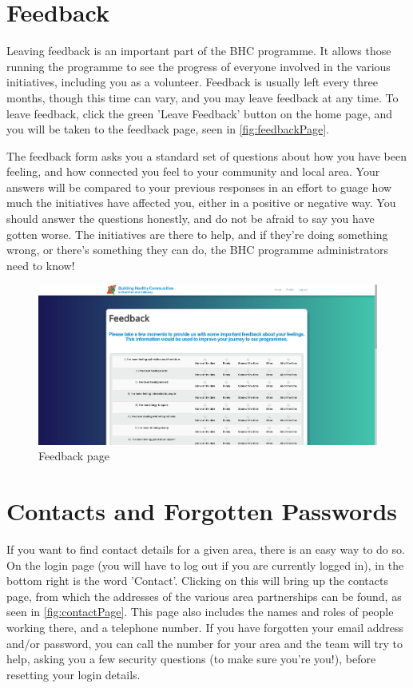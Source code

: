 \documentclass{bhcguides}
\begin{document}
\pagebreak

\section{Feedback}
\label{sec:feedback}

Leaving feedback is an important part of the BHC programme. It allows those running the programme to see the progress of everyone involved in the various initiatives, including you as a volunteer. Feedback is usually left every three months, though this time can vary, and you may leave feedback at any time. To leave feedback, click the green 'Leave Feedback' button on the home page, and you will be taken to the feedback page, seen in \autoref{fig:feedbackPage}.

The feedback form asks you a standard set of questions about how you have been feeling, and how connected you feel to your community and local area. Your answers will be compared to your previous responses in an effort to guage how much the initiatives have affected you, either in a positive or negative way. You should answer the questions honestly, and do not be afraid to say you have gotten worse. The initiatives are there to help, and if they're doing something wrong, or there's something they can do, the BHC programme administrators need to know!

\begin{figure}[h]
 \centerline{\includegraphics[width=\textwidth, height=\textheight, keepaspectratio]{feedbackpage.png}}
 \caption{Feedback page}
 \label{fig:feedbackPage}
\end{figure}

\section{Contacts and Forgotten Passwords}
\label{sec:contacts}

If you want to find contact details for a given area, there is an easy way to do so. On the login page (you will have to log out if you are currently logged in), in the bottom right is the word 'Contact'. Clicking on this will bring up the contacts page, from which the addresses of the various area partnerships can be found, as seen in \autoref{fig:contactPage}. This page also includes the names and roles of people working there, and a telephone number. If you have forgotten your email address and/or password, you can call the number for your area and the team will try to help, asking you a few security questions (to make sure you're you!), before resetting your login details.
\end{document}
